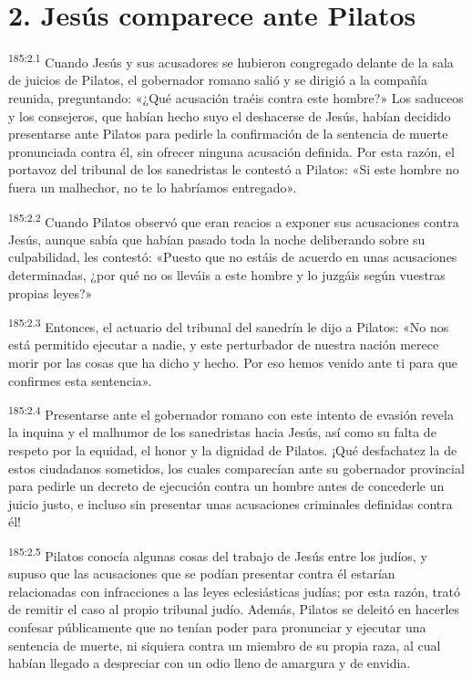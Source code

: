 \section*{2. Jesús comparece ante Pilatos}
\par 
\textsuperscript{185:2.1} Cuando Jesús y sus acusadores se hubieron congregado delante de la sala de juicios de Pilatos, el gobernador romano salió y se dirigió a la compañía reunida, preguntando: «¿Qué acusación traéis contra este hombre?» Los saduceos y los consejeros, que habían hecho suyo el deshacerse de Jesús, habían decidido presentarse ante Pilatos para pedirle la confirmación de la sentencia de muerte pronunciada contra él, sin ofrecer ninguna acusación definida. Por esta razón, el portavoz del tribunal de los sanedristas le contestó a Pilatos: «Si este hombre no fuera un malhechor, no te lo habríamos entregado».

\par 
\textsuperscript{185:2.2} Cuando Pilatos observó que eran reacios a exponer sus acusaciones contra Jesús, aunque sabía que habían pasado toda la noche deliberando sobre su culpabilidad, les contestó: «Puesto que no estáis de acuerdo en unas acusaciones determinadas, ¿por qué no os lleváis a este hombre y lo juzgáis según vuestras propias leyes?»

\par 
\textsuperscript{185:2.3} Entonces, el actuario del tribunal del sanedrín le dijo a Pilatos: «No nos está permitido ejecutar a nadie, y este perturbador de nuestra nación merece morir por las cosas que ha dicho y hecho. Por eso hemos venido ante ti para que confirmes esta sentencia».

\par 
\textsuperscript{185:2.4} Presentarse ante el gobernador romano con este intento de evasión revela la inquina y el malhumor de los sanedristas hacia Jesús, así como su falta de respeto por la equidad, el honor y la dignidad de Pilatos. ¡Qué desfachatez la de estos ciudadanos sometidos, los cuales comparecían ante su gobernador provincial para pedirle un decreto de ejecución contra un hombre antes de concederle un juicio justo, e incluso sin presentar unas acusaciones criminales definidas contra él!

\par 
\textsuperscript{185:2.5} Pilatos conocía algunas cosas del trabajo de Jesús entre los judíos, y supuso que las acusaciones que se podían presentar contra él estarían relacionadas con infracciones a las leyes eclesiásticas judías; por esta razón, trató de remitir el caso al propio tribunal judío. Además, Pilatos se deleitó en hacerles confesar públicamente que no tenían poder para pronunciar y ejecutar una sentencia de muerte, ni siquiera contra un miembro de su propia raza, al cual habían llegado a despreciar con un odio lleno de amargura y de envidia.

